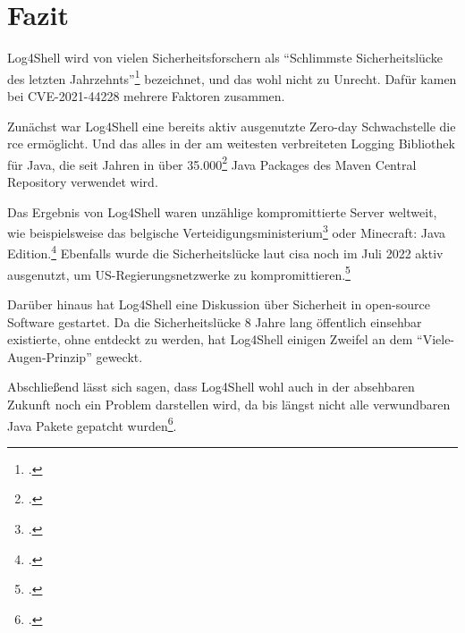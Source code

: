 
\section{Fazit}\label{sec:fazit}
Log4Shell wird von vielen Sicherheitsforschern als ``Schlimmste Sicherheitslücke des letzten Jahrzehnts''\footcite{guardianArticle} bezeichnet, und das wohl nicht zu Unrecht.
Dafür kamen bei CVE-2021-44228 mehrere Faktoren zusammen.

Zunächst war Log4Shell eine bereits aktiv ausgenutzte Zero-day Schwachstelle die \gls{rce} ermöglicht.
Und das alles in der am weitesten verbreiteten Logging Bibliothek für Java, die seit Jahren in über 35.000\footcite{impact} Java Packages des Maven Central Repository verwendet wird.

\bigskip
Das Ergebnis von Log4Shell waren unzählige kompromittierte Server weltweit, wie beispielsweise das belgische Verteidigungsministerium\footcite{zdNet} oder Minecraft: Java Edition.\footcite{minecraftForum}
Ebenfalls wurde die Sicherheitslücke laut \gls{cisa} noch im Juli 2022 aktiv ausgenutzt, um US-Regierungsnetzwerke zu kompromittieren.\footcite{cisaAlert}

Darüber hinaus hat Log4Shell eine Diskussion über Sicherheit in open-source Software gestartet.
Da die Sicherheitslücke 8 Jahre lang öffentlich einsehbar existierte, ohne entdeckt zu werden, hat Log4Shell einigen Zweifel an dem ``Viele-Augen-Prinzip'' geweckt.

\bigskip
Abschließend lässt sich sagen, dass Log4Shell wohl auch in der absehbaren Zukunft noch ein Problem darstellen wird, da bis längst nicht alle verwundbaren Java Pakete gepatcht wurden\footcite{kaspersky}.

